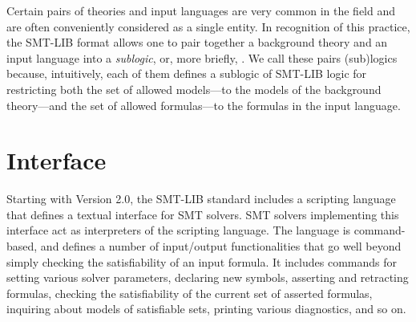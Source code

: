 Certain pairs of theories and input languages are very common in the field
and are often conveniently considered as a single entity.
In recognition of this practice,
the SMT-LIB format allows one to pair together 
a background theory and an input language into a \emph{sublogic}, 
or, more briefly, .
We call these pairs (sub)logics because,
intuitively, 
each of them defines a sublogic of SMT-LIB logic
for restricting 
both the set of allowed models---to the models of the background theory---and 
the set of allowed formulas---to the formulas in the input language.


\section{Interface}

Starting with Version 2.0, the SMT-LIB standard includes a scripting language that 
defines a textual interface for SMT solvers.
SMT solvers implementing this interface act as interpreters
of the scripting language.
The language is command-based,
and defines a number of input/output functionalities
that go well beyond simply checking the satisfiability of an input formula.
It includes commands for 
setting various solver parameters,
declaring new symbols, 
asserting and retracting formulas, 
checking the satisfiability of the current set of asserted formulas, 
inquiring about models of satisfiable sets,
printing various diagnostics, and so on.

